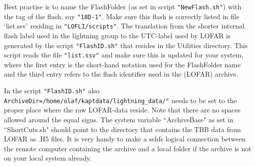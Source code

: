 Best practise is to name the FlashFolder (as set in script \verb!"NewFlash.sh"!) with the tag of the flash, say \verb!"18D-1"!. Make sure this flash is correctly listed in file `list.ssv' residing in \verb!"LOFLI/scripts"!.
The translation from the shorter internal flash label used in the lightning group to the UTC-label used by LOFAR is generated by the script \verb!"FlashID.sh"! that resides in the Utilities directory. This script reads the file \verb!"list.ssv"! and make sure this is updated for your system, where the first entry is the short-hand notation used for the FlashFolder name and the third entry refers to the flash identifier used in the (LOFAR) archive.



In the script \verb!"FlashID.sh"! also \verb!ArchiveDir=/home/olaf/kaptdata/lightning_data/"! needs to be set to the proper place where the raw LOFAR-data reside. Note that there are no spaces allowed around the equal signs. The system variable ``ArchiveBase" as set in ``ShortCuts.sh" should point to the directory that contains the TBB data from LOFAR as .H5 files. It is very handy to make a sshfs logical connection between the remote computer containing the archive and a local folder if the archive is not on your local system already.
